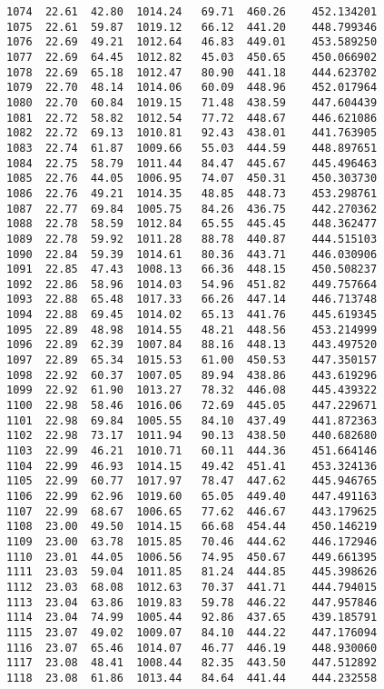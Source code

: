 \documentclass[11pt]{article}
\begin{document}
\begin{tcolorbox}[breakable, size=fbox, boxrule=.5pt, pad at break*=1mm, opacityfill=0]
\begin{Verbatim}[commandchars=\\\{\}]
1074  22.61  42.80  1014.24   69.71  460.26    452.134201
1075  22.61  59.87  1019.12   66.12  441.20    448.799346
1076  22.69  49.21  1012.64   46.83  449.01    453.589250
1077  22.69  64.45  1012.82   45.03  450.65    450.066902
1078  22.69  65.18  1012.47   80.90  441.18    444.623702
1079  22.70  48.14  1014.06   60.09  448.96    452.017964
1080  22.70  60.84  1019.15   71.48  438.59    447.604439
1081  22.72  58.82  1012.54   77.72  448.67    446.621086
1082  22.72  69.13  1010.81   92.43  438.01    441.763905
1083  22.74  61.87  1009.66   55.03  444.59    448.897651
1084  22.75  58.79  1011.44   84.47  445.67    445.496463
1085  22.76  44.05  1006.95   74.07  450.31    450.303730
1086  22.76  49.21  1014.35   48.85  448.73    453.298761
1087  22.77  69.84  1005.75   84.26  436.75    442.270362
1088  22.78  58.59  1012.84   65.55  445.45    448.362477
1089  22.78  59.92  1011.28   88.78  440.87    444.515103
1090  22.84  59.39  1014.61   80.36  443.71    446.030906
1091  22.85  47.43  1008.13   66.36  448.15    450.508237
1092  22.86  58.96  1014.03   54.96  451.82    449.757664
1093  22.88  65.48  1017.33   66.26  447.14    446.713748
1094  22.88  69.45  1014.02   65.13  441.76    445.619345
1095  22.89  48.98  1014.55   48.21  448.56    453.214999
1096  22.89  62.39  1007.84   88.16  448.13    443.497520
1097  22.89  65.34  1015.53   61.00  450.53    447.350157
1098  22.92  60.37  1007.05   89.94  438.86    443.619296
1099  22.92  61.90  1013.27   78.32  446.08    445.439322
1100  22.98  58.46  1016.06   72.69  445.05    447.229671
1101  22.98  69.84  1005.55   84.10  437.49    441.872363
1102  22.98  73.17  1011.94   90.13  438.50    440.682680
1103  22.99  46.21  1010.71   60.11  444.36    451.664146
1104  22.99  46.93  1014.15   49.42  451.41    453.324136
1105  22.99  60.77  1017.97   78.47  447.62    445.946765
1106  22.99  62.96  1019.60   65.05  449.40    447.491163
1107  22.99  68.67  1006.65   77.62  446.67    443.179625
1108  23.00  49.50  1014.15   66.68  454.44    450.146219
1109  23.00  63.78  1015.85   70.46  444.62    446.172946
1110  23.01  44.05  1006.56   74.95  450.67    449.661395
1111  23.03  59.04  1011.85   81.24  444.85    445.398626
1112  23.03  68.08  1012.63   70.37  441.71    444.794015
1113  23.04  63.86  1019.83   59.78  446.22    447.957846
1114  23.04  74.99  1005.44   92.86  437.65    439.185791
1115  23.07  49.02  1009.07   84.10  444.22    447.176094
1116  23.07  65.46  1014.07   46.77  446.19    448.930060
1117  23.08  48.41  1008.44   82.35  443.50    447.512892
1118  23.08  61.86  1013.44   84.64  441.44    444.232558

\end{Verbatim}
\end{tcolorbox}
\end{document}
